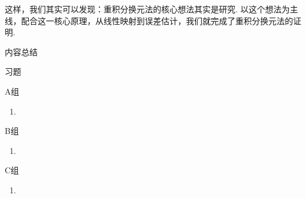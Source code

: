这样，我们其实可以发现：重积分换元法的核心想法其实是研究. 以这个想法为主线，配合这一核心原理，从线性映射到误差估计，我们就完成了重积分换元法的证明.

\vspace{2ex}
\centerline{\heiti \Large 内容总结}

\vspace{2ex}
\centerline{\heiti \Large 习题}

\vspace{2ex}
{\kaishu }
\begin{flushright}
    \kaishu

\end{flushright}

\centerline{\heiti A组}
\begin{enumerate}
    \item
\end{enumerate}

\centerline{\heiti B组}
\begin{enumerate}
    \item
\end{enumerate}

\centerline{\heiti C组}
\begin{enumerate}
    \item
\end{enumerate}
